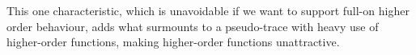 This one characteristic, which is unavoidable if we want to support full-on
higher order behaviour, adds what surmounts to a pseudo-trace with heavy use
of higher-order functions, making higher-order functions unattractive.

%
%
%
%
%
%
%
%
%
